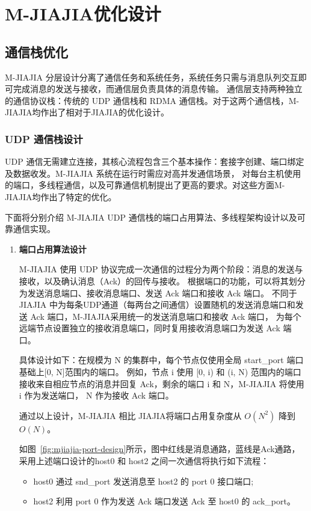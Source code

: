 {    \section{M-JIAJIA优化设计}\label{sec:M-JIAJIA优化设计}
    \subsection{通信栈优化}
    M-JIAJIA 分层设计分离了通信任务和系统任务，系统任务只需与消息队列交互即可完成消息的发送与接收，而通信层负责具体的消息传输。
    通信层支持两种独立的通信协议栈：传统的 UDP 通信栈和 RDMA 通信栈。对于这两个通信栈，M-JIAJIA均作出了相对于JIAJIA的优化设计。

    \subsubsection{UDP 通信栈设计}
    UDP 通信无需建立连接，其核心流程包含三个基本操作：套接字创建、端口绑定及数据收发。M-JIAJIA 系统在运行时需应对高并发通信场景，
    对每台主机使用的端口，多线程通信，以及可靠通信机制提出了更高的要求。对这些方面M-JIAJIA均作出了特定的优化。

    下面将分别介绍 M-JIAJIA UDP 通信栈的端口占用算法、多线程架构设计以及可靠通信实现。
    \begin{enumerate}[label=\arabic*.]
        \item \textbf{端口占用算法设计}

              M-JIAJIA 使用 UDP 协议完成一次通信的过程分为两个阶段：消息的发送与接收，以及确认消息（Ack）的回传与接收。
              根据端口的功能，可以将其划分为发送消息端口、接收消息端口、发送 Ack 端口和接收 Ack 端口。
              不同于 JIAJIA 中为每条UDP通道（每两台之间通信）设置随机的发送消息端口和发送 Ack 端口，M-JIAJIA采用统一的发送消息端口和接收 Ack 端口，
              为每个远端节点设置独立的接收消息端口，同时复用接收消息端口为发送 Ack 端口。

              具体设计如下：在规模为 N 的集群中，每个节点仅使用全局 start\_port 端口基础上[0, N]范围内的端口。
              例如，节点 i 使用 [0, i) 和 (i, N) 范围内的端口接收来自相应节点的消息并回复 Ack，剩余的端口 i 和 N，M-JIAJIA 将使用 i 作为发送端口，
              N 作为接收 Ack 端口。

              通过以上设计，M-JIAJIA 相比 JIAJIA将端口占用复杂度从 $O(N^2)$ 降到 $O(N)$。

              如图~\ref{fig:mjiajia-port-design}所示，图中红线是消息通路，蓝线是Ack通路，采用上述端口设计的host0 和 host2 之间一次通信将执行如下流程：
              \begin{itemize}
                  \item host0 通过 snd\_port 发送消息至 host2 的 port 0 接口端口;
                  \item host2 利用 port 0 作为发送 Ack 端口发送 Ack 至 host0 的 ack\_port。
              \end{itemize}


\end{enumerate}}
